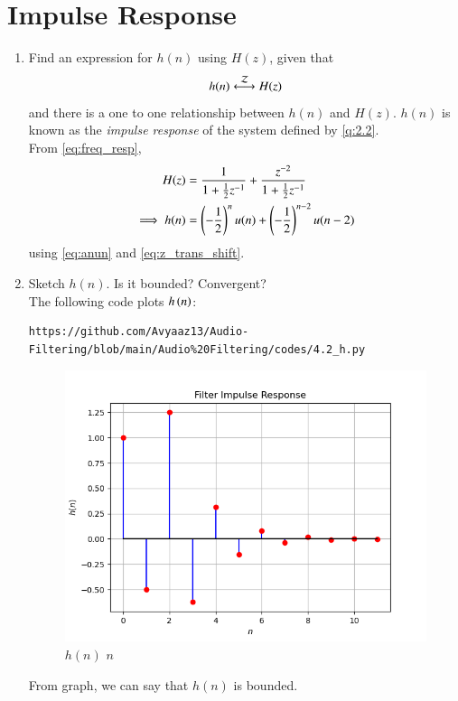 \documentclass[journal,12pt,twocolumn]{IEEEtran}
\theoremstyle{remark}
\renewcommand\thesection{\arabic{section}}
\numberwithin{equation}{subsection}
\begin{document}
\section{Impulse Response}
\begin{enumerate}[label=\thesection.\arabic*]
\item \label{prob:impulse_resp}
Find an expression for $h(n)$ using $H(z)$, given that 
\begin{equation}
\label{eq:impulse_resp}
h(n) \system{Z} H(z)
\end{equation}
and there is a one to one relationship between $h(n)$ and $H(z)$. $h(n)$ is known as the {\em impulse response} of the
system defined by \eqref{q:2.2}.
\\
\solution From \eqref{eq:freq_resp},
\begin{align}
H(z) &= \frac{1}{1 + \frac{1}{2}z^{-1}} + \frac{ z^{-2}}{1 + \frac{1}{2}z^{-1}}
\\
\implies h(n) &= \left(-\frac{1}{2}\right)^{n}u(n) + \left(-\frac{1}{2}\right)^{n-2}u(n-2)\label{hneqn}
\end{align}
using \eqref{eq:anun} and \eqref{eq:z_trans_shift}.
\item Sketch $h(n)$. Is it bounded? Convergent? 
\\
\solution The following code plots $h\left(n\right)$: 
\begin{lstlisting}
https://github.com/Avyaaz13/Audio-Filtering/blob/main/Audio%20Filtering/codes/4.2_h.py
\end{lstlisting}
\begin{figure}[!ht]
\centering
\includegraphics[width=\columnwidth]{figs/hn}
\caption{$h(n)$  $n$}
\label{fig:hn}
\end{figure}
From graph, we can say that $h(n)$ is bounded.


\end{enumerate}
\end{document}
